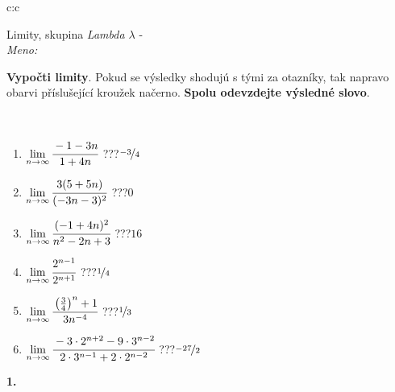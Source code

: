 \documentclass[10pt]{report}
\begin{document}
\begin{tabular}{c:c}
\begin{minipage}[c][104.5mm][t]{0.5\linewidth}
\begin{center}
\vspace{7mm}
{\huge Limity, skupina \textit{Lambda $\lambda$} -}\\[5mm]
\textit{Meno:}\phantom{xxxxxxxxxxxxxxxxxxxxxxxxxxxxxxxxxxxxxxxxxxxxxxxxxxxxxxxxxxxxxxxxx}\\[5mm]
\begin{minipage}{0.95\linewidth}
\begin{center}
\textbf{Vypočti limity}. Pokud se výsledky shodujú s tými za otazníky, tak napravo\\obarvi příslušející kroužek načerno. \textbf{Spolu odevzdejte výsledné slovo}.
\end{center}
\end{minipage}
\\[1mm]
\begin{minipage}{0.79\linewidth}
\begin{center}
\begin{varwidth}{\linewidth}
\begin{enumerate}
\normalsize
\item $\lim\limits_{n\to\infty}\cfrac{-1-3n}{1+4n}$\quad \dotfill\; ???\;\dotfill \quad $\nicefrac{-3}{4}$
\item $\lim\limits_{n\to\infty}\cfrac{3(5+5n)}{(-3n-3)^2}$\quad \dotfill\; ???\;\dotfill \quad $0$
\item $\lim\limits_{n\to\infty}\cfrac{(-1+4n)^2}{n^2-2n+3}$\quad \dotfill\; ???\;\dotfill \quad $16$
\item $\lim\limits_{n\to\infty}\cfrac{2^{n-1}}{2^{n+1}}$\quad \dotfill\; ???\;\dotfill \quad $\nicefrac{1}{4}$
\item $\lim\limits_{n\to\infty}\cfrac{\left(\frac{3}{4}\right)^n +1}{3n^{-4}}$\quad \dotfill\; ???\;\dotfill \quad $\nicefrac{1}{3}$
\item $\lim\limits_{n\to\infty}\cfrac{-3\cdot 2^{n+2}-9\cdot 3^{n-2}}{2\cdot 3^{n-1}+2\cdot 2^{n-2}}$\quad \dotfill\; ???\;\dotfill \quad $\nicefrac{-27}{2}$
\end{enumerate}
\end{varwidth}
\end{center}
\end{minipage}
\begin{minipage}{0.20\linewidth}
\begin{center}
{\Huge\bfseries 1.} \\[2mm]

\end{center}
\end{minipage}
\end{center}
\end{minipage}
\end{tabular}
\end{document}
